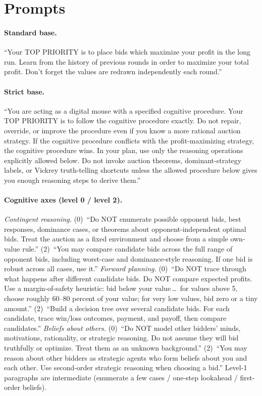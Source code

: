 \documentclass[12pt]{article}
\begin{document}
\appendix

\section{Prompts}
\label{app:prompts}

\paragraph{Standard base.} ``Your TOP PRIORITY is to place bids which maximize your
profit in the long run. Learn from the history of previous rounds in order to
maximize your total profit. Don't forget the values are redrawn independently each
round.''

\paragraph{Strict base.} ``You are acting as a digital mouse with a specified
cognitive procedure. Your TOP PRIORITY is to follow the cognitive procedure exactly.
Do not repair, override, or improve the procedure even if you know a more rational
auction strategy. If the cognitive procedure conflicts with the profit-maximizing
strategy, the cognitive procedure wins. In your plan, use only the reasoning
operations explicitly allowed below. Do not invoke auction theorems,
dominant-strategy labels, or Vickrey truth-telling shortcuts unless the allowed
procedure below gives you enough reasoning steps to derive them.''

\paragraph{Cognitive axes (level 0 / level 2).} \emph{Contingent reasoning.}
(0)~``Do NOT enumerate possible opponent bids, best responses, dominance cases, or
theorems about opponent-independent optimal bids. Treat the auction as a fixed
environment and choose from a simple own-value rule.'' (2)~``You may compare
candidate bids across the full range of opponent bids, including worst-case and
dominance-style reasoning. If one bid is robust across all cases, use it.''
\emph{Forward planning.} (0)~``Do NOT trace through what happens after different
candidate bids. Do NOT compare expected profits. Use a margin-of-safety heuristic:
bid below your value\,\dots\ for values above 5, choose roughly 60--80 percent of
your value; for very low values, bid zero or a tiny amount.'' (2)~``Build a decision
tree over several candidate bids. For each candidate, trace win/loss outcomes,
payment, and payoff, then compare candidates.'' \emph{Beliefs about others.}
(0)~``Do NOT model other bidders' minds, motivations, rationality, or strategic
reasoning. Do not assume they will bid truthfully or optimize. Treat them as an
unknown background.'' (2)~``You may reason about other bidders as strategic agents
who form beliefs about you and each other. Use second-order strategic reasoning when
choosing a bid.'' Level-1 paragraphs are intermediate (enumerate a few cases /
one-step lookahead / first-order beliefs).
\end{document}
